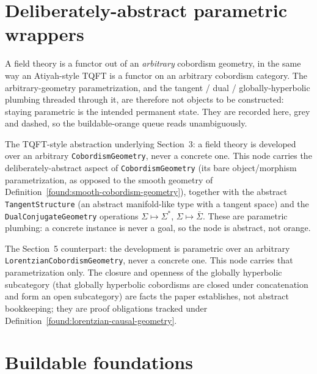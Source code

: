 \section{Deliberately-abstract parametric wrappers}

A field theory is a functor out of an \emph{arbitrary} cobordism geometry, in the same way
an Atiyah-style TQFT is a functor on an arbitrary cobordism category. The
arbitrary-geometry parametrization, and the tangent / dual / globally-hyperbolic plumbing
threaded through it, are therefore not objects to be constructed: staying parametric is the
intended permanent state. They are recorded here, grey and dashed, so the buildable-orange
queue reads unambiguously.

\begin{definition}
  \label{abstract:cobordism-domain}
  \abstractnode
  The TQFT-style abstraction underlying Section~3: a field theory is developed over an
  arbitrary \texttt{CobordismGeometry}, never a concrete one. This node carries the
  deliberately-abstract aspect of \texttt{CobordismGeometry} (its bare object/morphism
  parametrization, as opposed to the smooth geometry of
  Definition~\ref{found:smooth-cobordism-geometry}), together with the abstract
  \texttt{TangentStructure} (an abstract manifold-like type with a tangent space) and the
  \texttt{DualConjugateGeometry} operations $\Sigma \mapsto \Sigma^*$, $\Sigma \mapsto
  \bar\Sigma$. These are parametric plumbing: a concrete instance is never a goal, so the
  node is abstract, not orange.
\end{definition}

\begin{definition}
  \label{abstract:lorentzian-domain}
  \abstractnode
  The Section~5 counterpart: the development is parametric over an arbitrary
  \texttt{LorentzianCobordismGeometry}, never a concrete one. This node carries that
  parametrization only. The closure and openness of the globally hyperbolic subcategory
  (that globally hyperbolic cobordisms are closed under concatenation and form an open
  subcategory) are facts the paper establishes, not abstract bookkeeping; they are proof
  obligations tracked under Definition~\ref{found:lorentzian-causal-geometry}.
\end{definition}

\section{Buildable foundations}

